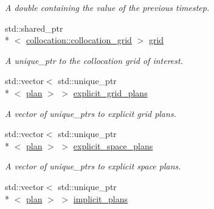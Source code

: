 \begin{DoxyCompactItemize}
\begin{DoxyCompactList}\small\item\em A double containing the value of the previous timestep. \end{DoxyCompactList}\item 
\hypertarget{classelement_1_1element_afc376c5fee8b02ee93ca2d85dc4885db}{std\-::shared\-\_\-ptr\\*
$<$ \hyperlink{classcollocation_1_1collocation__grid}{collocation\-::collocation\-\_\-grid} $>$ \hyperlink{classelement_1_1element_afc376c5fee8b02ee93ca2d85dc4885db}{grid}}\label{classelement_1_1element_afc376c5fee8b02ee93ca2d85dc4885db}

\begin{DoxyCompactList}\small\item\em A unique\-\_\-ptr to the collocation grid of interest. \end{DoxyCompactList}\item 
\hypertarget{classelement_1_1element_a56f12828a1f17236ec40ee69022dbb95}{std\-::vector$<$ std\-::unique\-\_\-ptr\\*
$<$ \hyperlink{classplan}{plan} $>$ $>$ \hyperlink{classelement_1_1element_a56f12828a1f17236ec40ee69022dbb95}{explicit\-\_\-grid\-\_\-plans}}\label{classelement_1_1element_a56f12828a1f17236ec40ee69022dbb95}

\begin{DoxyCompactList}\small\item\em A vector of unique\-\_\-ptrs to explicit grid plans. \end{DoxyCompactList}\item 
\hypertarget{classelement_1_1element_af91fb5622e48f98e39e42867be1d2f4e}{std\-::vector$<$ std\-::unique\-\_\-ptr\\*
$<$ \hyperlink{classplan}{plan} $>$ $>$ \hyperlink{classelement_1_1element_af91fb5622e48f98e39e42867be1d2f4e}{explicit\-\_\-space\-\_\-plans}}\label{classelement_1_1element_af91fb5622e48f98e39e42867be1d2f4e}

\begin{DoxyCompactList}\small\item\em A vector of unique\-\_\-ptrs to explicit space plans. \end{DoxyCompactList}\item 
\hypertarget{classelement_1_1element_a78058a3fed0a625c5d4f025ebd44c83f}{std\-::vector$<$ std\-::unique\-\_\-ptr\\*
$<$ \hyperlink{classplan}{plan} $>$ $>$ \hyperlink{classelement_1_1element_a78058a3fed0a625c5d4f025ebd44c83f}{implicit\-\_\-plans}}\label{classelement_1_1element_a78058a3fed0a625c5d4f025ebd44c83f}


\end{DoxyCompactItemize}
